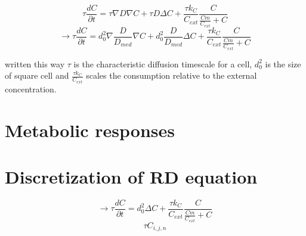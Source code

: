 \documentclass[11pt,a4paper]{article}
\begin{document}
\[ \tau \frac{d C}{\partial t}  = \tau \nabla D \nabla C + \tau  D  \Delta C + \frac{\tau k_C}{C_{ext}} \frac{C}{\frac{Cm}{C_{ext}} + C}  \]
\[ \rightarrow \tau \frac{d C}{\partial t}  = d_0^2 \nabla \frac{D}{D_{med}} \nabla C + d_0^2 \frac{D}{D_{med}} \Delta C + \frac{\tau k_C}{C_{ext}} \frac{C}{\frac{Cm}{C_{ext}} + C}  \]

written this way $\tau$ is the characteristic diffusion timescale for a cell, $d_0^2$ is the size of square cell and $\frac{\tau k_C}{C_{ext}}$ scales the consumption relative to the external concentration.


\section{Metabolic responses} 


\section*{Discretization of RD equation}
\[ \rightarrow \tau \frac{d C}{\partial t}  = d_0^2  \Delta C + \frac{\tau k_C}{C_{ext}} \frac{C}{\frac{Cm}{C_{ext}} + C}  \]  
\[ \tau C_{i,j,n}  \]

\newpage


\end{document}
